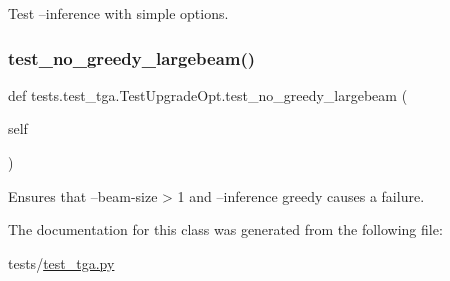 \begin{DoxyVerb}Test --inference with simple options.
\end{DoxyVerb}
 \mbox{\label{classtests_1_1test__tga_1_1TestUpgradeOpt_a811fa4e0fa3155e3a031968cbc69b369}} 
\subsubsection{\texorpdfstring{test\+\_\+no\+\_\+greedy\+\_\+largebeam()}{test\_no\_greedy\_largebeam()}}
{\footnotesize\ttfamily def tests.\+test\+\_\+tga.\+Test\+Upgrade\+Opt.\+test\+\_\+no\+\_\+greedy\+\_\+largebeam (\begin{DoxyParamCaption}\item[{}]{self }\end{DoxyParamCaption})}

\begin{DoxyVerb}Ensures that --beam-size > 1 and --inference greedy causes a failure.
\end{DoxyVerb}
 

The documentation for this class was generated from the following file\+:\begin{DoxyCompactItemize}
\item 
tests/\hyperlink{test__tga_8py}{test\+\_\+tga.\+py}\end{DoxyCompactItemize}
